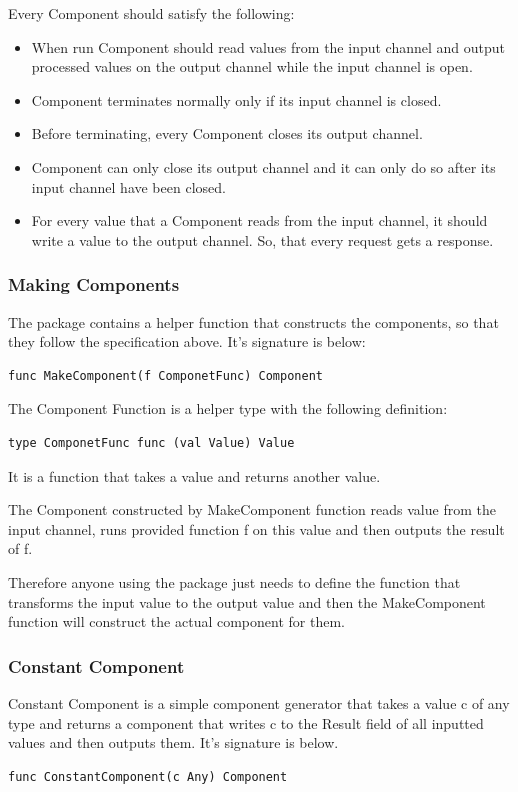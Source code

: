 \documentclass[12pt,a4paper]{article}
\begin{document}
Every Component should satisfy the following:
\begin{itemize}
  \item When run Component should read values from the input channel
				and output processed values on the output channel while the input 
				channel is open.
	\item Component terminates normally only if its input channel is closed.
	\item Before terminating, every Component closes its output channel.
	\item Component can only close its output channel and it can only do so
				after its input channel have been closed.
	\item For every value that a Component reads from the input channel, 
				it should write a value to the output channel. So, that every request 
				gets a response.
  
\end{itemize}

\subsubsection{Making Components}
The package contains a helper function that constructs the components,
so that they follow the specification above. It's signature is below:
\begin{lstlisting}
func MakeComponent(f ComponetFunc) Component
\end{lstlisting}

The Component Function is a helper type with the following definition:
\begin{lstlisting}
type ComponetFunc func (val Value) Value
\end{lstlisting}
It is a function that takes a value and returns another value.

The Component constructed by MakeComponent function reads value from the
input channel, runs provided function f on this value and then outputs the
result of f.

Therefore anyone using the package just needs to define the function that
transforms the input value to the output value and then the MakeComponent
function will construct the actual component for them.

\subsubsection{Constant Component}
Constant Component is a simple component generator that takes a value c
of any type and returns a component that writes c to the Result field of all inputted values and then outputs them. It's signature is below.
\begin{lstlisting}
func ConstantComponent(c Any) Component
\end{lstlisting}
\end{document}
